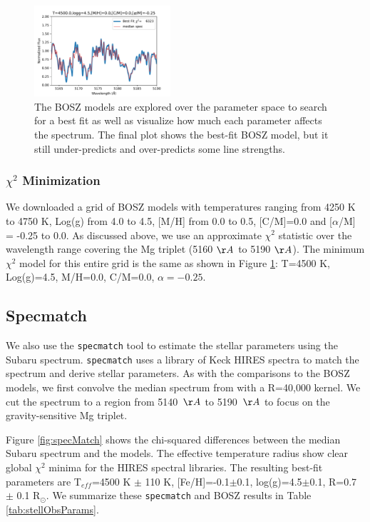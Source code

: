 \documentclass[preprint]{aastex61}
\begin{document}
\begin{figure}[!hbtp]
\begin{centering}
\includegraphics[width=0.45\textwidth]{images/bosz_model_exploration/FINAL_exploration.pdf}
\caption{The BOSZ models are explored over the parameter space to search for a best fit as well as visualize how much each parameter affects the spectrum.
The final plot shows the best-fit BOSZ model, but it still under-predicts and over-predicts some line strengths.}\label{fig:boszModelParamsMedianSpec}
\end{centering}
\end{figure}

\subsubsection{$\chi^2$ Minimization}
We downloaded a grid of BOSZ models with temperatures ranging from 4250 K to 4750 K, Log(g) from 4.0 to 4.5, [M/H] from 0.0 to 0.5, [C/M]=0.0 and [$\alpha$/M] = -0.25 to 0.0.
As discussed above, we use an approximate $\chi^2$ statistic over the wavelength range covering the Mg triplet (5160 $\AA$ to 5190 $\AA$).
The minimum $\chi^2$ model for this entire grid is the same as shown in Figure \ref{fig:boszModelParamsMedianSpec}: T=4500 K, Log(g)=4.5, M/H=0.0, C/M=0.0, $\alpha=-0.25$.


\subsection{Specmatch}\label{sec:SpecMatch}

We also use the \texttt{specmatch} tool \citep{yee2017specMatch} to estimate the stellar parameters using the Subaru spectrum.
\texttt{specmatch} uses a library of Keck HIRES spectra to match the spectrum and derive stellar parameters.
As with the comparisons to the BOSZ models, we first convolve the median spectrum from \citet{masuda2018rvKIC1255} with a R=40,000 kernel.
We cut the spectrum to a region from 5140~$\AA$ to 5190~$\AA$ to focus on the gravity-sensitive Mg triplet.

Figure \ref{fig:specMatch} shows the chi-squared differences between the median Subaru spectrum and the models.
The effective temperature radius show clear global $\chi^2$ minima for the HIRES spectral libraries.
The resulting best-fit parameters are T$_{eff}$=4500 K $\pm$ 110 K, [Fe/H]=-0.1$\pm$0.1, log(g)=4.5$\pm$0.1, R=0.7 $\pm$ 0.1 R$_\odot$.
We summarize these \texttt{specmatch} and BOSZ results in Table \ref{tab:stellObsParams}.
\end{document}
